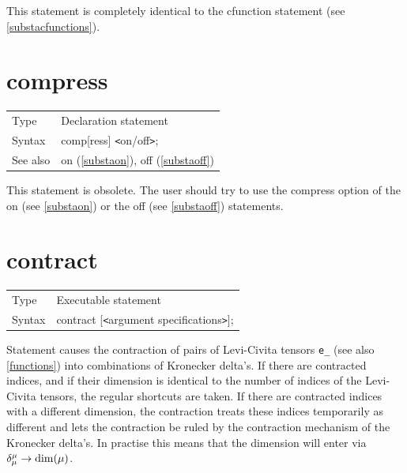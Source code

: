 \noindent This statement is completely identical to the 
cfunction statement (see \ref{substacfunctions}). \vspace{10mm}


\section{compress}
\label{substacompress}

\noindent \begin{tabular}{ll}
Type & Declaration statement\\
Syntax & comp[ress] {\tt<}on/off{\tt>};
\\ See also & on (\ref{substaon}), off (\ref{substaoff})
\end{tabular} \vspace{4mm}

\noindent This statement is obsolete. The user should try 
to use the compress option of the on (see \ref{substaon}) or the off (see 
\ref{substaoff}) statements. \vspace{10mm}


\section{contract}
\label{substacontract}

\noindent \begin{tabular}{ll}
Type & Executable statement\\
Syntax & contract [{\tt<}argument specifications{\tt>}];
\end{tabular} \vspace{4mm}

\noindent Statement causes the contraction of pairs of 
Levi-Civita tensors \verb:e_: 
(see also \ref{functions}) into combinations of Kronecker 
delta's. If there are contracted indices, and if 
their dimension is identical to the number of indices of the Levi-Civita 
tensors, the regular shortcuts are taken. If there are contracted indices 
with a different dimension, the contraction treats these indices 
temporarily as different and lets the contraction be ruled by the 
contraction mechanism of the Kronecker delta's. In practise this means that 
the dimension will enter via $\delta^{\mu}_{\mu} \rightarrow {\rm 
dim}(\mu)$. \vspace{4mm}

